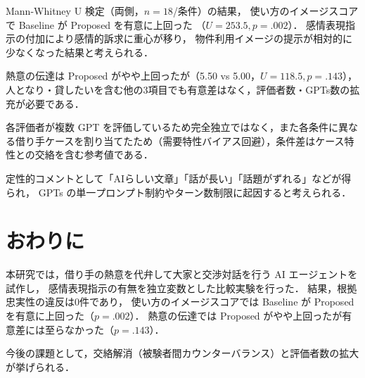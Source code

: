 \documentclass[dvipdfmx]{FITpaper}
\begin{document}
Mann-Whitney U 検定（両側，$n=18$/条件）の結果，
使い方のイメージスコアで Baseline が Proposed を有意に上回った
（$U=253.5, p=.002$）．
感情表現指示の付加により感情的訴求に重心が移り，
物件利用イメージの提示が相対的に少なくなった結果と考えられる．

熱意の伝達は Proposed がやや上回ったが（5.50 vs 5.00，$U=118.5, p=.143$），
人となり・貸したいを含む他の3項目でも有意差はなく，評価者数・GPTs数の拡充が必要である．

各評価者が複数 GPT を評価しているため完全独立ではなく，また各条件に異なる借り手ケースを割り当てたため（需要特性バイアス回避），条件差はケース特性との交絡を含む参考値である．

定性的コメントとして「AIらしい文章」「話が長い」「話題がずれる」などが得られ，
GPTs の単一プロンプト制約やターン数制限に起因すると考えられる．\\


\section{おわりに}

本研究では，借り手の熱意を代弁して大家と交渉対話を行う AI エージェントを試作し，
感情表現指示の有無を独立変数とした比較実験を行った．
結果，根拠忠実性の違反は0件であり，
使い方のイメージスコアでは Baseline が Proposed を有意に上回った（$p=.002$）．
熱意の伝達では Proposed がやや上回ったが有意差には至らなかった（$p=.143$）．

今後の課題として，交絡解消（被験者間カウンターバランス）と評価者数の拡大が挙げられる．



\footnotesize


\end{document}
